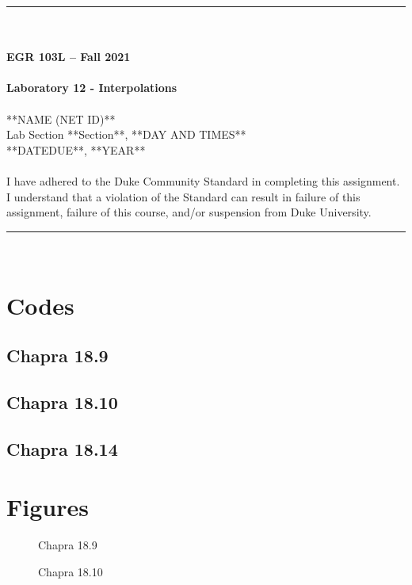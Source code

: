 \documentclass{article}
\begin{document}
\begin{center}
\rule{6.5in}{0.5mm}\\~\\
\textbf{\large EGR 103L -- Fall 2021}\\~\\
\textbf{\huge Laboratory 12 - Interpolations}\\~\\
**NAME (NET ID)**\\
Lab Section **Section**, **DAY AND TIMES**\\
**DATEDUE**, **YEAR**\\~\\
{\small I have adhered to the Duke Community Standard in completing this assignment.  I understand that a violation of the Standard can result in failure of this assignment, failure of this course, and/or suspension from Duke University.} 
\rule{6.5in}{0.5mm}\\
\end{center}
\tableofcontents
\listoffigures
\clearpage

\appendix
\section{Codes}
\lstset{style=python103, language=python} 

\subsection{Chapra 18.9}
\clearpage 

\subsection{Chapra 18.10}
\clearpage

\subsection{Chapra 18.14}
\clearpage

\section{Figures}
\begin{figure}[h!]
\begin{center}
\caption{Chapra 18.9}
\end{center}
\end{figure}

\begin{figure}[h!]
\begin{center}
\caption{Chapra 18.10}
\end{center}
\end{figure}
\end{document}
